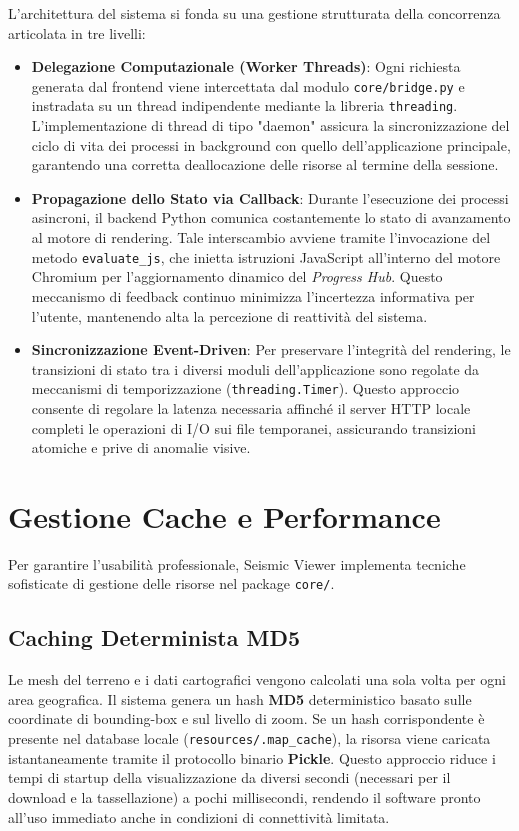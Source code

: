 \documentclass[12pt,a4paper]{article}
\begin{document}
L'architettura del sistema si fonda su una gestione strutturata della concorrenza articolata in tre livelli:
\begin{itemize}
    \item \textbf{Delegazione Computazionale (Worker Threads)}: Ogni richiesta generata dal frontend viene intercettata dal modulo \texttt{core/bridge.py} e instradata su un thread indipendente mediante la libreria \texttt{threading}. L'implementazione di thread di tipo "daemon" assicura la sincronizzazione del ciclo di vita dei processi in background con quello dell'applicazione principale, garantendo una corretta deallocazione delle risorse al termine della sessione.
    \item \textbf{Propagazione dello Stato via Callback}: Durante l'esecuzione dei processi asincroni, il backend Python comunica costantemente lo stato di avanzamento al motore di rendering. Tale interscambio avviene tramite l'invocazione del metodo \texttt{evaluate\_js}, che inietta istruzioni JavaScript all'interno del motore Chromium per l'aggiornamento dinamico del \textit{Progress Hub}. Questo meccanismo di feedback continuo minimizza l'incertezza informativa per l'utente, mantenendo alta la percezione di reattività del sistema.
    \item \textbf{Sincronizzazione Event-Driven}: Per preservare l'integrità del rendering, le transizioni di stato tra i diversi moduli dell'applicazione sono regolate da meccanismi di temporizzazione (\texttt{threading.Timer}). Questo approccio consente di regolare la latenza necessaria affinché il server HTTP locale completi le operazioni di I/O sui file temporanei, assicurando transizioni atomiche e prive di anomalie visive.
\end{itemize}

\section{Gestione Cache e Performance}
Per garantire l'usabilità professionale, Seismic Viewer implementa tecniche sofisticate di gestione delle risorse nel package \texttt{core/}.

\subsection{Caching Determinista MD5}
Le mesh del terreno e i dati cartografici vengono calcolati una sola volta per ogni area geografica. Il sistema genera un hash \textbf{MD5} deterministico basato sulle coordinate di bounding-box e sul livello di zoom. Se un hash corrispondente è presente nel database locale (\texttt{resources/.map\_cache}), la risorsa viene caricata istantaneamente tramite il protocollo binario \textbf{Pickle}. Questo approccio riduce i tempi di startup della visualizzazione da diversi secondi (necessari per il download e la tassellazione) a pochi millisecondi, rendendo il software pronto all'uso immediato anche in condizioni di connettività limitata.
\end{document}
